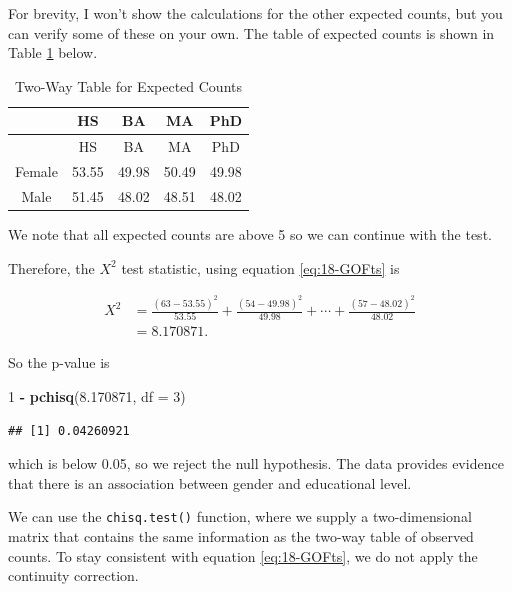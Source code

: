 \documentclass[
]{book}
\newenvironment{Shaded}{\begin{snugshade}}{\end{snugshade}}
\newcommand{\AttributeTok}[1]{\textcolor[rgb]{0.13,0.29,0.53}{#1}}
\newcommand{\DecValTok}[1]{\textcolor[rgb]{0.00,0.00,0.81}{#1}}
\newcommand{\FloatTok}[1]{\textcolor[rgb]{0.00,0.00,0.81}{#1}}
\newcommand{\FunctionTok}[1]{\textcolor[rgb]{0.13,0.29,0.53}{\textbf{#1}}}
\newcommand{\NormalTok}[1]{#1}
\newcommand{\SpecialCharTok}[1]{\textcolor[rgb]{0.81,0.36,0.00}{\textbf{#1}}}
\theoremstyle{definition}
\theoremstyle{definition}
\theoremstyle{definition}
\theoremstyle{definition}
\theoremstyle{remark}
\begin{document}
For brevity, I won't show the calculations for the other expected counts, but you can verify some of these on your own. The table of expected counts is shown in Table \ref{tab:eg2wayexp} below.

\begin{longtable}[]{@{}ccccc@{}}
\caption{\label{tab:eg2wayexp} Two-Way Table for Expected Counts}\tabularnewline
\toprule\noalign{}
& HS & BA & MA & PhD \\
\midrule\noalign{}
\endfirsthead
\toprule\noalign{}
& HS & BA & MA & PhD \\
\midrule\noalign{}
\endhead
\bottomrule\noalign{}
\endlastfoot
Female & 53.55 & 49.98 & 50.49 & 49.98 \\
Male & 51.45 & 48.02 & 48.51 & 48.02 \\
\end{longtable}

We note that all expected counts are above 5 so we can continue with the test.

Therefore, the \(X^2\) test statistic, using equation \eqref{eq:18-GOFts} is

\[
\begin{split}
X^2 &= \frac{(63 - 53.55)^2}{53.55} + \frac{(54 - 49.98)^2}{49.98} + \cdots + \frac{(57 - 48.02)^2}{48.02} \\
        &= 8.170871.
\end{split}
\]

So the p-value is

\begin{Shaded}
\begin{Highlighting}[]
\DecValTok{1} \SpecialCharTok{{-}} \FunctionTok{pchisq}\NormalTok{(}\FloatTok{8.170871}\NormalTok{, }\AttributeTok{df =} \DecValTok{3}\NormalTok{)}
\end{Highlighting}
\end{Shaded}

\begin{verbatim}
## [1] 0.04260921
\end{verbatim}

which is below 0.05, so we reject the null hypothesis. The data provides evidence that there is an association between gender and educational level.

We can use the \texttt{chisq.test()} function, where we supply a two-dimensional matrix that contains the same information as the two-way table of observed counts. To stay consistent with equation \eqref{eq:18-GOFts}, we do not apply the continuity correction.
\end{document}
